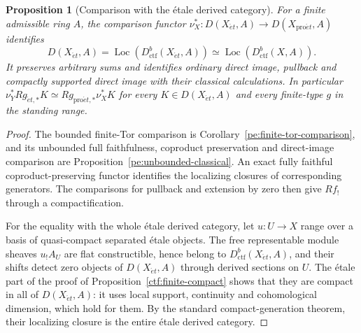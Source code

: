 \documentclass[11pt,a4paper]{article}
\numberwithin{equation}{section}
\newtheorem{proposition}[theorem]{Proposition}
\theoremstyle{definition}
\theoremstyle{remark}
\newcommand{\Loc}{\operatorname{Loc}}
\newcommand{\et}{\acute{e}t}
\newcommand{\proet}{\mathrm{pro}\acute{e}t}
\newcommand{\Dctf}{D^b_{\mathrm{ctf}}}
\begin{document}
\begin{proposition}[Comparison with the \'etale derived category]
\label{ctf:finite-comparison}\label{ctf:eq:unbounded-comparison}
For a finite admissible ring $A$, the comparison functor
$\nu_X^*\colon D(X_{\et},A)\to D(X_{\proet},A)$ identifies
\[
 D(X_{\et},A)=\Loc(\Dctf(X_{\et},A))
       \simeq\Loc(\Dctf(X,A)).
\]
It preserves arbitrary sums and identifies ordinary direct image,
pullback and compactly supported direct image with their classical
calculations. In particular
$\nu_Y^*Rg_{\et,*}K\simeq Rg_{\proet,*}\nu_X^*K$ for every
$K\in D(X_{\et},A)$ and every finite-type $g$ in the standing range.
\end{proposition}
\begin{proof}
The bounded finite-Tor comparison is
Corollary~\ref{pe:finite-tor-comparison}, and its unbounded full
faithfulness, coproduct preservation and direct-image comparison are
Proposition~\ref{pe:unbounded-classical}. An exact fully faithful
coproduct-preserving functor identifies the localizing closures of
corresponding generators. The comparisons for pullback and extension by
zero then give $Rf_!$ through a compactification.

For the equality with the whole \'etale derived category, let
$u:U\to X$ range over a basis of quasi-compact separated \'etale
objects. The free representable module sheaves $u_!A_U$ are flat
constructible, hence belong to $\Dctf(X_{\et},A)$, and their shifts
detect zero objects of $D(X_{\et},A)$ through derived sections on $U$.
The \'etale part of the proof of Proposition~\ref{ctf:finite-compact}
shows that they are compact in all of $D(X_{\et},A)$: it uses local
support, continuity and cohomological dimension, which hold for them. By the standard
compact-generation theorem, their localizing closure is the entire
\'etale derived category.
\end{proof}
\end{document}
